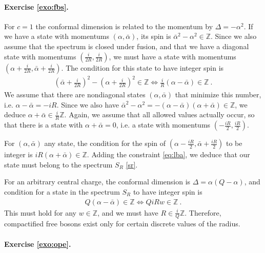 \documentclass[12pt, a4paper]{article}
\theoremstyle{break}
\begin{document}
\paragraph{Exercise \ref{exo:fbs}.}

For $c=1$ the conformal dimension is related to the momentum by $\Delta = -\alpha^2$. If we have a state with momentums $(\alpha,\bar\alpha)$, its spin is $\bar\alpha^2-\alpha^2\in\mathbb{Z}$. Since we also assume that the spectrum is closed under fusion, and that we have a diagonal state with momentums $(\frac{i}{2R},\frac{i}{2R})$, we must have a state with momentums $(\alpha +\frac{i}{2R},\bar \alpha+\frac{i}{2R})$. The condition for this state to have integer spin is 
\begin{align}
 \left(\bar \alpha +\tfrac{i}{2R}\right)^2 - \left(\alpha +\tfrac{i}{2R}\right)^2 \in \mathbb{Z} \iff \frac{i}{R}(\alpha -\bar \alpha)\in\mathbb{Z}\ .
 \label{eq:lba}
\end{align}
We assume that there are nondiagonal states $(\alpha,\bar\alpha)$ that minimize this number, i.e. $\alpha-\bar\alpha = -iR$.
Since we also have $\bar\alpha^2-\alpha^2 = -(\alpha-\bar \alpha)(\alpha+\bar \alpha)\in\mathbb{Z}$, we deduce $\alpha+\bar\alpha\in \frac{i}{R}\mathbb{Z}$. Again, we assume that all allowed values actually occur, so that there is a state with $\alpha+\bar\alpha = 0$, i.e. a state with momentums $(-\frac{iR}{2},\frac{iR}{2})$.

For $(\alpha,\bar\alpha)$ any state, the condition for the spin of $(\alpha-\frac{iR}{2},\bar\alpha +\frac{iR}{2})$ to be integer is $iR(\alpha+\bar\alpha)\in\mathbb{Z}$. Adding the constraint \eqref{eq:lba}, we deduce that our state must belong to the spectrum $S_R$ \eqref{sr}.

For an arbitrary central charge, the conformal dimension is $\Delta = \alpha(Q-\alpha)$, and condition for  a state in the spectrum $S_R$ to have integer spin is 
\begin{align}
 Q(\alpha-\bar \alpha) \in\mathbb{Z} \iff QiRw \in\mathbb{Z}\ .
\end{align}
This must hold for any $w\in\mathbb{Z}$, and we must have $R\in \frac{i}{Q}\mathbb{Z}$. Therefore, compactified free bosons exist only for certain discrete values of the radius.


\paragraph{Exercise \ref{exo:ope}.}
\end{document}
